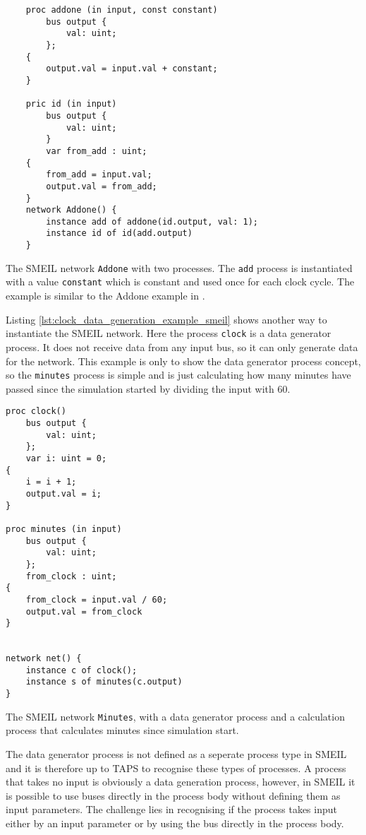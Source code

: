 \begin{listing}
    \begin{verbatim}
    proc addone (in input, const constant)
        bus output {
            val: uint;
        };
    {
        output.val = input.val + constant;
    }

    pric id (in input)
        bus output {
            val: uint;
        }
        var from_add : uint;
    {
        from_add = input.val;
        output.val = from_add;
    }
    network Addone() {
        instance add of addone(id.output, val: 1);
        instance id of id(add.output)
    }
    \end{verbatim}
    \caption{The SMEIL network \texttt{Addone} with two processes. The \texttt{add} process is instantiated with a value \texttt{constant} which is constant and used once for each clock cycle. The example is similar to the Addone example in \cite{smeil}.}
    \label{lst:addone_data_generation_example}
\end{listing}
Listing \ref{lst:clock_data_generation_example_smeil} shows another way to instantiate the SMEIL network. Here the process \texttt{clock} is a data generator process. It does not receive data from any input bus, so it can only generate data for the network. This example is only to show the data generator process concept, so the \texttt{minutes} process is simple and is just calculating how many minutes have passed since the simulation started by dividing the input with 60.
\begin{listing}
    \begin{verbatim}
proc clock()
    bus output {
        val: uint;
    };
    var i: uint = 0;
{
    i = i + 1;
    output.val = i;
}

proc minutes (in input)
    bus output {
        val: uint;
    };
    from_clock : uint;
{
    from_clock = input.val / 60;
    output.val = from_clock
}


network net() {
    instance c of clock();
    instance s of minutes(c.output)
}
    \end{verbatim}
    \caption{The SMEIL network \texttt{Minutes}, with a data generator process and a calculation process that calculates minutes since simulation start.}
    \label{lst:clock_data_generation_example_smeil}
\end{listing}

The data generator process is not defined as a seperate process type in SMEIL and it is therefore up to TAPS to recognise these types of processes. A process that takes no input is obviously a data generation process, however, in SMEIL it is possible to use buses directly in the process body without defining them as input parameters. The challenge lies in recognising if the process takes input either by an input parameter or by using the bus directly in the process body.\\

